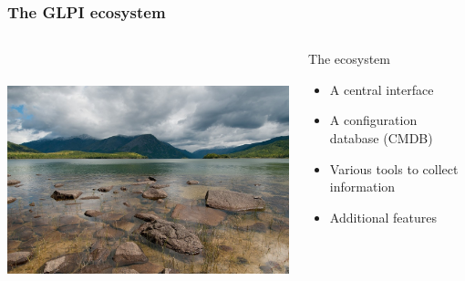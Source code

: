 \documentclass{beamer}
\begin{document}
\begin{frame}

    \frametitle{The GLPI ecosystem}

 \begin{columns}
 \begin{column}{0.45\textwidth}
         \includegraphics[height=7.5cm]{./pics/ecosystem.jpg}
 \end{column}
 \begin{column}{0.65\textwidth}
    \begin{block}{The ecosystem}
        \begin{itemize}
            \item A central interface
            \item A configuration database (CMDB)
            \item Various tools to collect information
            \item Additional features
        \end{itemize}
    \end{block}

 \end{column}
\end{columns}

\end{frame}
\end{document}
